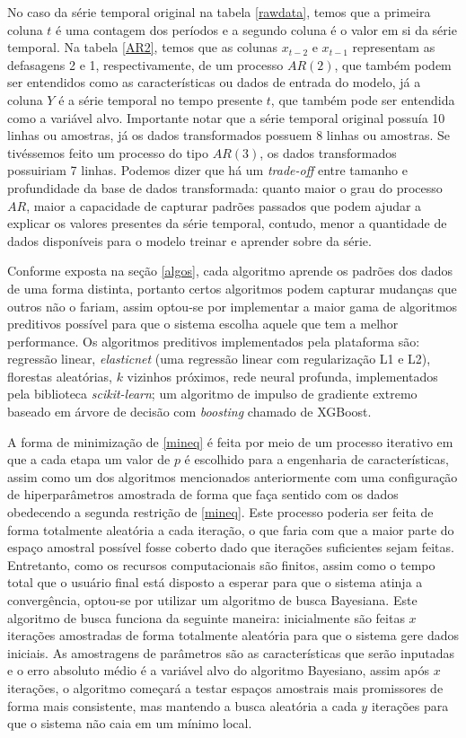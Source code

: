 \documentclass[twocolumn]{rbef}
\newcommand{\1}{\mathbbm{1}}
\begin{document}
No caso da série temporal original na tabela \ref{rawdata}, temos que a primeira coluna $t$ é uma contagem dos períodos e a segundo coluna é o valor em si da série temporal. Na tabela \ref{AR2}, temos que as colunas $x_{t-2}$ e $x_{t-1}$ representam as defasagens 2 e 1, respectivamente, de um processo $AR(2)$, que também podem ser entendidos como as características ou dados de entrada do modelo, já a coluna $Y$ é a série temporal no tempo presente $t$, que também pode ser entendida como a variável alvo. Importante notar que a série temporal original possuía 10 linhas ou amostras, já os dados transformados possuem 8 linhas ou amostras. Se tivéssemos feito um processo do tipo $AR(3)$, os dados transformados possuiriam 7 linhas. Podemos dizer que há um \textit{trade-off} entre tamanho e profundidade da base de dados transformada: quanto maior o grau do processo $AR$, maior a capacidade de capturar padrões passados que podem ajudar a explicar os valores presentes da série temporal, contudo, menor a quantidade de dados disponíveis para o modelo treinar e aprender sobre da série.

Conforme exposta na seção \ref{algos}, cada algoritmo aprende os padrões dos dados de uma forma distinta, portanto certos algoritmos podem capturar mudanças que outros não o fariam, assim optou-se por implementar a maior gama de algoritmos preditivos possível para que o sistema escolha aquele que tem a melhor performance. Os algoritmos preditivos implementados pela plataforma são: regressão linear, \textit{elasticnet} (uma regressão linear com regularização L1 e L2), florestas aleatórias, $k$ vizinhos próximos, rede neural profunda, implementados pela biblioteca \textit{scikit-learn}\cite{Pedregosa}; um algoritmo de impulso de gradiente extremo baseado em árvore de decisão com \textit{boosting} chamado de XGBoost\cite{Chen}.

A forma de minimização de \ref{mineq} é feita por meio de um processo iterativo em que a cada etapa um valor de $p$ é escolhido para a engenharia de características, assim como um dos algoritmos mencionados anteriormente com uma configuração de hiperparâmetros amostrada de forma que faça sentido com os dados obedecendo a segunda restrição de \ref{mineq}. Este processo poderia ser feita de forma totalmente aleatória a cada iteração, o que faria com que a maior parte do espaço amostral possível fosse coberto dado que iterações suficientes sejam feitas. Entretanto, como os recursos computacionais são finitos, assim como o tempo total que o usuário final está disposto a esperar para que o sistema atinja a convergência, optou-se por utilizar um algoritmo de busca Bayesiana\cite{Lévesque}. Este algoritmo de busca funciona da seguinte maneira: inicialmente são feitas $x$ iterações amostradas de forma totalmente aleatória para que o sistema gere dados iniciais. As amostragens de parâmetros são as características que serão inputadas e o erro absoluto médio é a variável alvo do algoritmo Bayesiano, assim após $x$ iterações, o algoritmo começará a testar espaços amostrais mais promissores de forma mais consistente, mas mantendo a busca aleatória a cada $y$ iterações para que o sistema não caia em um mínimo local.
\end{document}
